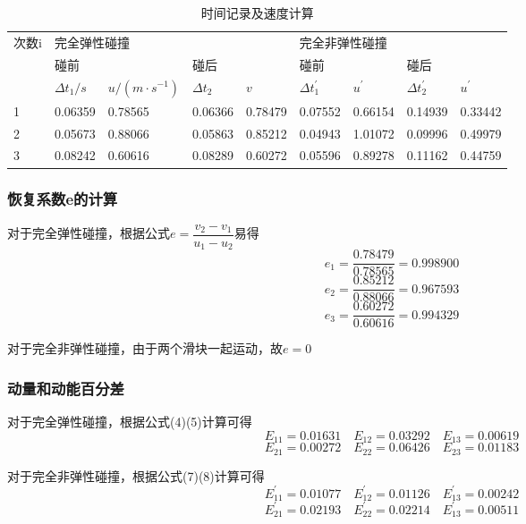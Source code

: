 \documentclass[UTF8]{article}
\begin{document}
	\begin{table}[h]
		\centering
		\begin{tabular}{|l|llll|llll|}
			\hline
			\multirow{3}{*}{次数i} & \multicolumn{4}{l|}{完全弹性碰撞}                                                            & \multicolumn{4}{l|}{完全非弹性碰撞}                                                           \\ \cline{2-9} 
			& \multicolumn{2}{l|}{碰前}                              & \multicolumn{2}{l|}{碰后}         & \multicolumn{2}{l|}{碰前}                              & \multicolumn{2}{l|}{碰后}         \\ \cline{2-9} 
			& \multicolumn{1}{l|}{$\Delta t_1/s$}     & \multicolumn{1}{l|}{$u/(m\cdot s^{-1})$} & \multicolumn{1}{l|}{$\Delta t_2$}     & $v$ & \multicolumn{1}{l|}{$\Delta t_1^{'}$}     & \multicolumn{1}{l|}{$u^{'}$} & \multicolumn{1}{l|}{$\Delta t_2^{'}$}     & $u^{'}$ \\ \hline
			1                    & \multicolumn{1}{l|}{0.06359} & \multicolumn{1}{l|}{0.78565} & \multicolumn{1}{l|}{0.06366} & 0.78479 & \multicolumn{1}{l|}{0.07552} & \multicolumn{1}{l|}{0.66154} & \multicolumn{1}{l|}{0.14939} & 0.33442 \\ \hline
			2                    & \multicolumn{1}{l|}{0.05673} & \multicolumn{1}{l|}{0.88066} & \multicolumn{1}{l|}{0.05863} & 0.85212 & \multicolumn{1}{l|}{0.04943} & \multicolumn{1}{l|}{1.01072} & \multicolumn{1}{l|}{0.09996} & 0.49979 \\ \hline
			3                    & \multicolumn{1}{l|}{0.08242} & \multicolumn{1}{l|}{0.60616} & \multicolumn{1}{l|}{0.08289} & 0.60272 & \multicolumn{1}{l|}{0.05596} & \multicolumn{1}{l|}{0.89278} & \multicolumn{1}{l|}{0.11162} & 0.44759 \\ \hline
		\end{tabular}
		\caption{时间记录及速度计算}
	\end{table}
	\subsubsection*{恢复系数e的计算}
	对于完全弹性碰撞，根据公式$e=\dfrac{v_2-v_1}{u_1-u_2}$易得
	\[e_1 = \frac{0.78479}{0.78565}=0.998900 \]
	\[e_2 = \frac{0.85212}{0.88066}=0.967593\]
	 \[e_3 = \frac{0.60272}{0.60616}=0.994329\]
	 \par 对于完全非弹性碰撞，由于两个滑块一起运动，故$e=0$
	 \subsubsection*{动量和动能百分差}
  	\par 对于完全弹性碰撞，根据公式(4)(5)计算可得
  	\[E_{11}=0.01631\quad E_{12} = 0.03292\quad E_{13} = 0.00619\]
  	\[E_{21}=0.00272\quad E_{22}=0.06426 \quad E_{23}=0.01183\]
  	\par 对于完全非弹性碰撞，根据公式(7)(8)计算可得
  	\[E_{11}^{'}=0.01077 \quad E_{12}^{'}=0.01126 \quad E_{13}^{'}=0.00242\]
  	\[E_{21}^{'}=0.02193 \quad E_{22}^{'}=0.02214 \quad E_{13}^{'}=0.00511\]
\end{document}
